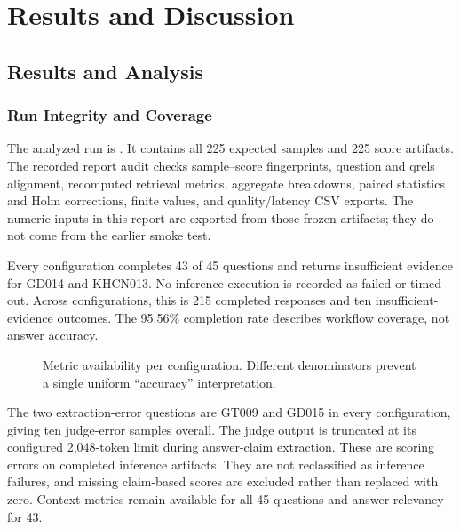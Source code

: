 \chapter{Results and Discussion}\label{ch:results}
\section{Results and Analysis}
\subsection{Run Integrity and Coverage}
The analyzed run is . It contains all 225 expected samples and 225 score artifacts. The recorded report audit checks sample--score fingerprints, question and qrels alignment, recomputed retrieval metrics, aggregate breakdowns, paired statistics and Holm corrections, finite values, and quality/latency CSV exports. The numeric inputs in this report are exported from those frozen artifacts; they do not come from the earlier smoke test.

Every configuration completes 43 of 45 questions and returns insufficient evidence for GD014 and KHCN013. No inference execution is recorded as failed or timed out. Across configurations, this is 215 completed responses and ten insufficient-evidence outcomes. The 95.56\% completion rate describes workflow coverage, not answer accuracy.

\begin{figure}[H]\centering
{}
\caption{Metric availability per configuration. Different denominators prevent a single uniform ``accuracy'' interpretation.}\label{fig:availability}
\end{figure}

The two extraction-error questions are GT009 and GD015 in every configuration, giving ten judge-error samples overall. The judge output is truncated at its configured 2,048-token limit during answer-claim extraction. These are scoring errors on completed inference artifacts. They are not reclassified as inference failures, and missing claim-based scores are excluded rather than replaced with zero. Context metrics remain available for all 45 questions and answer relevancy for 43.

